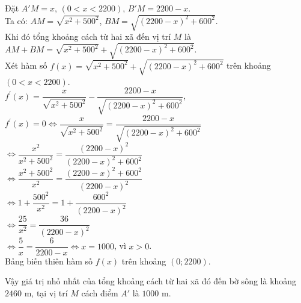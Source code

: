 \begin{vd}
{\begin{center}
		\end{center}
		Đặt $A'M=x$, $(0<x<2200)$,  $B'M=2200-x$.\\
		Ta có: $AM=\sqrt{x^2+500^2}$, $BM=\sqrt{(2200-x)^2+600^2}$.\\
		Khi đó tổng khoảng cách từ hai xã đến vị trí $M$ là $AM+BM= \sqrt{x^2+500^2}+\sqrt{(2200-x)^2+600^2} $.\\
		Xét hàm số $f(x)= \sqrt{x^2+500^2}+\sqrt{(2200-x)^2+600^2}$ trên khoảng $(0<x<2200)$.\\
		$f^\prime (x)=\dfrac{x}{\sqrt{x^2+500^2}}-\dfrac{2200-x}{\sqrt{(2200-x)^2+600^2}}$, $f^\prime (x)=0\Leftrightarrow \dfrac{x}{\sqrt{x^2+500^2}}=\dfrac{2200-x}{\sqrt{(2200-x)^2+600^2}}$\\
		$\Leftrightarrow \dfrac{x^2}{x^2+500^2}=\dfrac{(2200-x)^2}{(2200-x)^2+600^2}$\\
		$\Leftrightarrow \dfrac{x^2+500^2}{x^2}=\dfrac{(2200-x)^2+600^2}{(2200-x)^2}$\\
		$\Leftrightarrow 1+\dfrac{500^2}{x^2}=1+\dfrac{600^2}{(2200-x)^2}$\\
		$\Leftrightarrow \dfrac{25}{x^2}=\dfrac{36}{(2200-x)^2}$\\
		$\Leftrightarrow \dfrac{5}{x}=\dfrac{6}{2200-x}\Leftrightarrow x=1000$, vì $ x>0$.\\ 
		Bảng biến thiên hàm số $f(x)$ trên khoảng $\left( 0;2200\right)$.
		\begin{center}
		\end{center}
		Vậy giá trị nhỏ nhất của tổng khoảng cách từ hai xã đó đến bờ sông  là khoảng $2460 \text{ m}$, tại vị trí $M$ cách điểm $A'$  là $1000 \text{ m}$.
	}
\end{vd}
